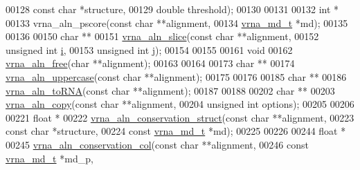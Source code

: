 \begin{DoxyCode}
00128                \textcolor{keyword}{const} \textcolor{keywordtype}{char}           *structure,
00129                \textcolor{keywordtype}{double}               threshold);
00130 
00131 
00132 \textcolor{keywordtype}{int} *
00133 vrna\_aln\_pscore(\textcolor{keyword}{const} \textcolor{keywordtype}{char}  **alignment,
00134                 \hyperlink{group__model__details_structvrna__md__s}{vrna\_md\_t}   *md);
00135 
00136 
00150 \textcolor{keywordtype}{char} **
00151 \hyperlink{group__aln__utils_gac801b0a72eac4ab9d5b2ef7533db9193}{vrna\_aln\_slice}(\textcolor{keyword}{const} \textcolor{keywordtype}{char}   **alignment,
00152                \textcolor{keywordtype}{unsigned} \textcolor{keywordtype}{int} \hyperlink{group__aln__utils_ab91db0a87ef8402dc151795ba5a64c6f}{i},
00153                \textcolor{keywordtype}{unsigned} \textcolor{keywordtype}{int} \hyperlink{group__aln__utils_a4142e38d6ba127acccdf680300a88e1f}{j});
00154 
00155 
00161 \textcolor{keywordtype}{void}
00162 \hyperlink{group__aln__utils_gac00dc80b8a324f151f92f11ab6850ecf}{vrna\_aln\_free}(\textcolor{keywordtype}{char} **alignment);
00163 
00164 
00173 \textcolor{keywordtype}{char} **
00174 \hyperlink{group__aln__utils_ga3a0476a71c4bae3d302790de58055704}{vrna\_aln\_uppercase}(\textcolor{keyword}{const} \textcolor{keywordtype}{char} **alignment);
00175 
00176 
00185 \textcolor{keywordtype}{char} **
00186 \hyperlink{group__aln__utils_ga7886fc678553c06472a712a335cde9cf}{vrna\_aln\_toRNA}(\textcolor{keyword}{const} \textcolor{keywordtype}{char} **alignment);
00187 
00188 
00202 \textcolor{keywordtype}{char} **
00203 \hyperlink{group__aln__utils_ga08cdca592461436860daf9738279ce17}{vrna\_aln\_copy}(\textcolor{keyword}{const} \textcolor{keywordtype}{char}    **alignment,
00204               \textcolor{keywordtype}{unsigned} \textcolor{keywordtype}{int}  options);
00205 
00206 
00221 \textcolor{keywordtype}{float} *
00222 \hyperlink{group__aln__utils_gab6f16a2ea93f3bfd4d089cc8d448bb16}{vrna\_aln\_conservation\_struct}(\textcolor{keyword}{const} \textcolor{keywordtype}{char}       **alignment,
00223                              \textcolor{keyword}{const} \textcolor{keywordtype}{char}       *structure,
00224                              \textcolor{keyword}{const} \hyperlink{group__model__details_structvrna__md__s}{vrna\_md\_t}  *md);
00225 
00226 
00244 \textcolor{keywordtype}{float} *
00245 \hyperlink{group__aln__utils_gaa12b481a7e7b965ef2eb1bcc4399e759}{vrna\_aln\_conservation\_col}(\textcolor{keyword}{const} \textcolor{keywordtype}{char}      **alignment,
00246                           \textcolor{keyword}{const} \hyperlink{group__model__details_structvrna__md__s}{vrna\_md\_t} *md\_p,

\end{DoxyCode}
